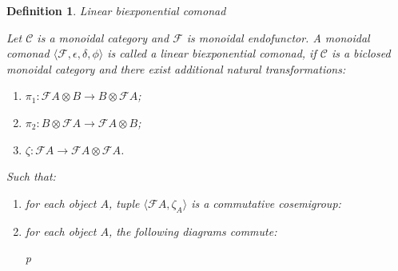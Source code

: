 \documentclass[a4paper]{article}
\newtheorem{defin}{Definition}
\begin{document}
\begin{defin} Linear biexponential comonad

  Let $\mathcal{C}$ is a monoidal category and $\mathcal{F}$ is monoidal endofunctor.
A monoidal comonad $\langle \mathcal{F}, \epsilon, \delta, \phi \rangle$ is called a linear biexponential comonad, if
$\mathcal{C}$ is a biclosed monoidal category and there exist additional natural transformations:
\begin{enumerate}
  \item $\pi_1 : \mathcal{F}A \otimes B \to B \otimes \mathcal{F}A$;
  \item $\pi_2 : B \otimes \mathcal{F}A \to \mathcal{F}A \otimes B$;
  \item $\zeta : \mathcal{F}A \to \mathcal{F}A \otimes \mathcal{F}A$.
\end{enumerate}

Such that:
\begin{enumerate}
  \item for each object $A$, tuple $\langle \mathcal{F}A, \zeta_{A} \rangle$ is a commutative cosemigroup:

  \item for each object $A$, the following diagrams commute:

\begin{minipage}{0.5\textwidth}
\end{minipage}%
\hfill
\begin{minipage}{0.5\textwidth}
\begin{tabular}{p{\textwidth}}
\end{tabular}
\end{minipage}
\end{enumerate}

\end{defin}
\end{document}
